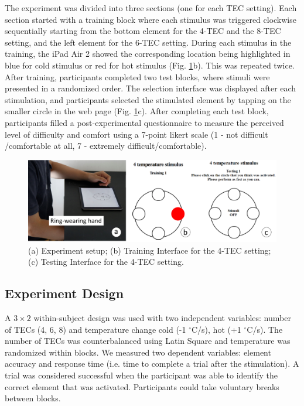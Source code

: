 \documentclass[preprint,12pt]{elsarticle}
\begin{document}
The experiment was divided into three sections (one for each TEC setting). Each section started with a training block where each stimulus was triggered clockwise sequentially starting from the bottom element for the 4-TEC and the 8-TEC setting, and the left element for the 6-TEC setting. During each stimulus in the training, the iPad Air 2 showed the corresponding location being highlighted in blue for cold stimulus or red for hot stimulus (Fig. \ref{fig:5}b). This was repeated twice. After training, participants completed two test blocks, where stimuli were presented in a randomized order. The selection interface was displayed after each stimulation, and participants selected the stimulated element by tapping on the smaller circle in the web page (Fig. \ref{fig:5}c). After completing each test block, participants filled a post-experimental questionnaire to measure the perceived level of difficulty and comfort using a 7-point likert scale (1 - not difficult /comfortable at all, 7 - extremely difficult/comfortable).


\begin{figure}[tp]
  \centering
  \includegraphics[width=0.8\columnwidth]{img/fig5.png}
  \caption{(a) Experiment setup; (b) Training Interface for the 4-TEC setting; (c) Testing Interface for the 4-TEC setting.}
  \label{fig:5}
\end{figure}

\subsection{Experiment Design}
A $3 \times 2$ within-subject design was used with two independent variables: number of TECs (4, 6, 8) and temperature change {cold (-1 $^{\circ}$C/s), hot (+1 $^{\circ}$C/s)}. The number of TECs was counterbalanced using Latin Square and temperature was randomized within blocks. We measured two dependent variables: element accuracy and response time (i.e. time to complete a trial after the stimulation). A trial was considered successful when the participant was able to identify the correct element that was activated. Participants could take voluntary breaks between blocks.
\end{document}
